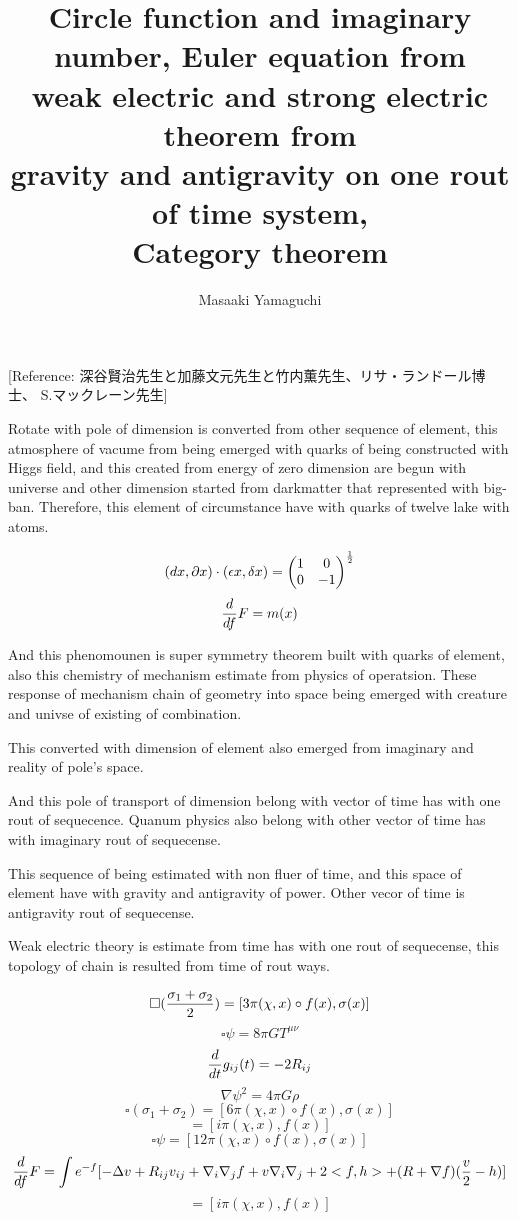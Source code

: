 \documentclass{jsarticle}
\begin{document}
{   [Reference: 深谷賢治先生と加藤文元先生と竹内薫先生、リサ・ランドール博士、
   S.マックレーン先生]




\title{Circle function and imaginary number, Euler equation from \\
        weak electric and strong electric theorem from \\
	gravity and antigravity on one rout of time system, \\
	          Category theorem}
\author{Masaaki Yamaguchi}

 Rotate with pole of dimension is converted from other sequence of element,  
this atmosphere of vacume from being emerged with quarks of being constructed
with Higgs field, and this created from energy of zero dimension are begun with
universe and other dimension started from darkmatter that represented with 
big-ban.
Therefore, this element of circumstance have with quarks of twelve lake with
atoms.

  $$ (dx, \partial x)\cdot (\epsilon x, \delta x) = \begin{pmatrix}
	  1 & 0 \\
  0 & - 1 \end{pmatrix}^{1 \over 2}  $$
  $$ {d \over df} F = m(x) $$

 And this phenomounen is super symmetry theorem built with quarks of element, 
also this chemistry of mechanism estimate from physics of operatsion.
These response of mechanism chain of geometry into space being emerged with
creature and univse of existing of combination.

  This converted with dimension of element also emerged from imaginary and 
reality of pole's space.

  And this pole of transport of dimension belong with vector of time has 
with one rout of sequecence. Quanum physics also belong with other vector 
of time has with imaginary rout of sequecense.

 This sequence of being estimated with non fluer of time, and this space 
of element have with gravity and antigravity of power.
Other vecor of time is antigravity rout of sequecense.

 Weak electric theory is estimate from time has with one rout of sequecense,
this topology of chain is resulted from time of rout ways.

      $$ \square ({{\sigma_1 + \sigma_2} \over 2 }) = [3 \pi (\chi,x) \circ f(x),
   \sigma(x)] $$
   $$ \square \psi = 8 \pi G T^{\mu\nu} $$
   $$ {d \over dt}g_{ij}(t) = - 2 R_{ij} $$
   $$ \nabla \psi^2 = 4 \pi G \rho $$
   $$ \square (\sigma_1 + \sigma_2) = [6\pi(\chi,x)\circ f(x), \sigma(x)] $$
   $$ = [i \pi(\chi,x),f(x)] $$
   $$ \square \psi = [12 \pi (\chi,x)\circ f(x), \sigma(x)] $$
   $$ {d \over df} F = \int e^{-f}[- \Delta v + R_{ij} v_{ij}+ 
   \nabla_i \nabla_j f  + v \nabla_i \nabla_j + 2<f,h> + (R + \nabla f)
   ({v \over 2} - h) ] $$
   $$ =[i \pi(\chi,x), f(x)] $$

}
\end{document}
